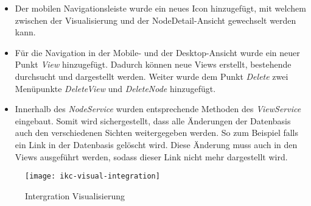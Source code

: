 \begin{itemize}
    \item Der mobilen Navigationsleiste wurde ein neues Icon hinzugefügt, mit welchem zwischen der Visualisierung und der NodeDetail-Ansicht gewechselt werden kann. 
    \item Für die Navigation in der Mobile- und der Desktop-Ansicht wurde ein neuer Punkt \textit{View} hinzugefügt. Dadurch können neue Views erstellt, bestehende durchsucht und dargestellt werden. Weiter wurde dem Punkt \textit{Delete} zwei Menüpunkte \textit{DeleteView} und \textit{DeleteNode} hinzugefügt. 
    \item Innerhalb des \textit{NodeService} wurden entsprechende Methoden des \textit{ViewService} eingebaut. Somit wird sichergestellt, dass alle Änd\-er\-ung\-en der Datenbasis auch den verschiedenen Sichten weitergegeben werden. So zum Beispiel falls ein \gls{Link} in der Datenbasis gelöscht wird. Diese Änderung muss auch in den Views ausgeführt werden, sodass dieser \gls{Link} nicht mehr dargestellt wird. 
    
\end{itemize}

\begin{figure}[htbp]
\centerline{\texttt{[image: ikc-visual-integration]}}
\caption{Intergration Visualisierung}
\label{fig:integration-visualisation}
\end{figure}

